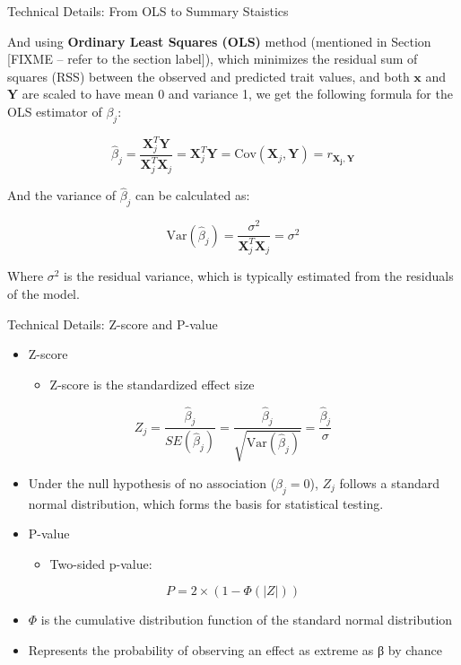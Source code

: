 \begin{frame}{Technical Details: From OLS to Summary Staistics}

And using \textbf{Ordinary Least Squares (OLS)} method (mentioned in Section [FIXME -- refer to the section label]), which minimizes the residual sum of squares (RSS) between the observed and predicted trait values, and both $\mathbf{x}$ and $\mathbf{Y}$ are scaled to have mean 0 and variance 1, we get the following formula for the OLS estimator of $ \beta_j$:

$$
\hat{\beta}_j = \frac{\mathbf{X}_j^T \mathbf{Y}}{\mathbf{X}_j^T \mathbf{X}_j} = \mathbf{X}_j^T \mathbf{Y} = \text{Cov}(\mathbf{X}_j, \mathbf{Y}) = r_{\mathbf{X_j}, \mathbf{Y}} 
$$

And the variance of $ \hat{\beta}_j $ can be calculated as:

$$
\text{Var}(\hat{\beta}_j) = \frac{\sigma^2}{\mathbf{X}_j^T \mathbf{X}_j} = \sigma^2
$$

Where $ \sigma^2 $ is the residual variance, which is typically estimated from the residuals of the model.

\end{frame}

\begin{frame}{Technical Details: Z-score and P-value}

\begin{itemize}
\item Z-score 
\begin{itemize}
\item Z-score is the standardized effect size
\end{itemize}
\end{itemize}

    $$
    Z_j = \frac{\hat{\beta}_j}{SE(\hat{\beta}_j)} = \frac{\hat{\beta}_j}{\sqrt{\text{Var}(\hat{\beta}_j)}} = \frac{\hat{\beta}_j}{\sigma}
    $$

\begin{itemize}
\item Under the null hypothesis of no association ($\beta_j = 0$), $Z_j$ follows a standard normal distribution, which forms the basis for statistical testing.
\end{itemize}

\begin{itemize}
\item P-value
\begin{itemize}
\item Two-sided p-value: 
\end{itemize}
\end{itemize}
    $$
    P = 2 \times (1 - \Phi(|Z|))
    $$
\begin{itemize}
\item $\Phi$ is the cumulative distribution function of the standard normal distribution
\item Represents the probability of observing an effect as extreme as β by chance
\end{itemize}

\end{frame}

